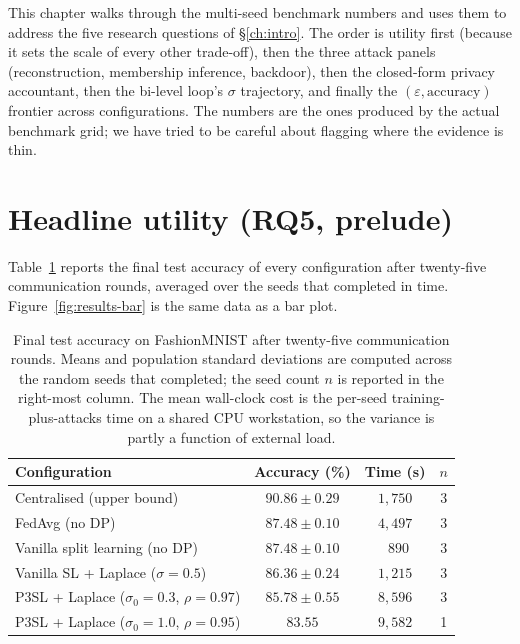 \documentclass[11pt,a4paper,oneside]{report}
\begin{document}
This chapter walks through the multi-seed benchmark numbers and uses
them to address the five research questions of \S\ref{ch:intro}. The
order is utility first (because it sets the scale of every other
trade-off), then the three attack panels (reconstruction, membership
inference, backdoor), then the closed-form privacy accountant, then
the bi-level loop's $\sigma$ trajectory, and finally the
$(\varepsilon, \text{accuracy})$ frontier across configurations. The
numbers are the ones produced by the actual benchmark grid; we have
tried to be careful about flagging where the evidence is thin.

\section{Headline utility (RQ5, prelude)}

Table~\ref{tab:utility} reports the final test accuracy of every
configuration after twenty-five communication rounds, averaged over
the seeds that completed in time. Figure~\ref{fig:results-bar} is
the same data as a bar plot.

\begin{table}[h]
\centering
\caption{Final test accuracy on FashionMNIST after twenty-five
communication rounds. Means and population standard deviations are
computed across the random seeds that completed; the seed count $n$
is reported in the right-most column. The mean wall-clock cost is
the per-seed training-plus-attacks time on a shared CPU
workstation, so the variance is partly a function of external load.}
\label{tab:utility}
\begin{tabular}{lccc}
\toprule
\textbf{Configuration} & \textbf{Accuracy (\%)} &
\textbf{Time (s)} & $n$\\
\midrule
Centralised (upper bound) & $90.86 \pm 0.29$ & $1{,}750$ & 3\\
FedAvg (no DP) & $87.48 \pm 0.10$ & $4{,}497$ & 3\\
Vanilla split learning (no DP) & $87.48 \pm 0.10$ & $\phantom{0}890$ & 3\\
Vanilla SL + Laplace ($\sigma{=}0.5$)& $86.36 \pm 0.24$ & $1{,}215$ & 3\\
P3SL + Laplace ($\sigma_0{=}0.3$, $\rho{=}0.97$)
 & $\mathbf{85.78 \pm 0.55}$ & $8{,}596$ & 3\\
P3SL + Laplace ($\sigma_0{=}1.0$, $\rho{=}0.95$)
 & $83.55$ & $9{,}582$ & 1\\
\bottomrule
\end{tabular}
\end{table}
\end{document}

